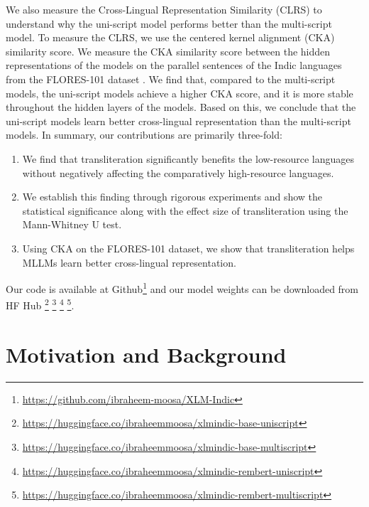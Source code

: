 \documentclass[11pt]{article}
\begin{document}
We also measure the Cross-Lingual Representation Similarity (CLRS) to understand why the uni-script model performs better than the multi-script model. To measure the CLRS, we use the centered kernel alignment (CKA) \citep{Kornblith2019SimilarityON} similarity score. We measure the CKA similarity score between the hidden representations of the models on the parallel sentences of the Indic languages from the FLORES-101 dataset \citep{Goyal2021TheFE}. We find that, compared to the multi-script models, the uni-script models achieve a higher CKA score, and it is more stable throughout the hidden layers of the models. Based on this, we conclude that the uni-script models learn better cross-lingual representation than the multi-script models. In summary, our contributions are primarily three-fold:
\begin{enumerate}
\item We find that transliteration significantly benefits the low-resource languages without negatively affecting the comparatively high-resource languages.
\item We establish this finding through rigorous experiments and show the statistical significance along with the effect size of transliteration using the Mann-Whitney U test.
\item Using CKA on the FLORES-101 dataset, we show that transliteration helps MLLMs learn better cross-lingual representation.
\end{enumerate}
Our code is available at Github\footnote{\url{https://github.com/ibraheem-moosa/XLM-Indic}}
and our model weights can be downloaded from HF Hub
\footnote{\url{https://huggingface.co/ibraheemmoosa/xlmindic-base-uniscript}}
\footnote{\url{https://huggingface.co/ibraheemmoosa/xlmindic-base-multiscript}}
\footnote{\url{https://huggingface.co/ibraheemmoosa/xlmindic-rembert-uniscript}}
\footnote{\url{https://huggingface.co/ibraheemmoosa/xlmindic-rembert-multiscript}}.
\section{Motivation and Background}
\label{motivation-and-background}
\end{document}
